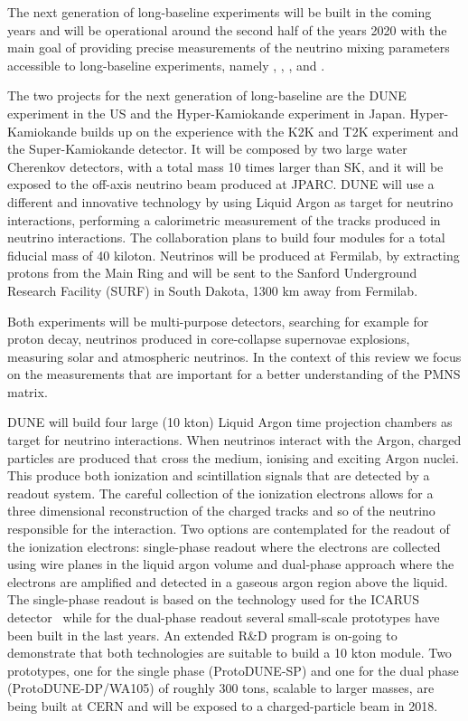The next generation of long-baseline experiments will be built in the coming years and will be operational around the second half of the years 2020 with the main goal of providing precise measurements of the neutrino mixing parameters accessible to long-baseline experiments, namely \thatm, \thint, \dmsq, and \dcp. 

The two projects for the next generation of long-baseline are the DUNE experiment in the US and the Hyper-Kamiokande experiment in Japan. Hyper-Kamiokande builds up on the experience with the K2K and T2K experiment and the Super-Kamiokande detector. It will be composed by two large water Cherenkov detectors, with a total mass 10 times larger than SK, and it will be exposed to the off-axis neutrino beam produced at JPARC. 
DUNE will use a different and innovative technology by using Liquid Argon as target for neutrino interactions, performing a calorimetric measurement of the tracks produced in neutrino interactions. The collaboration plans to build four modules for a total fiducial mass of 40 kiloton. Neutrinos will be produced at Fermilab, by extracting protons from the Main Ring and will be sent to the Sanford Underground Research Facility (SURF) in South Dakota, 1300 km away from Fermilab.

Both experiments will be multi-purpose detectors, searching for example for proton decay, neutrinos produced in core-collapse supernovae explosions, measuring solar and atmospheric neutrinos. In the context of this review we focus on the measurements  that are important for a better understanding of the PMNS matrix.

DUNE will build four large (10 kton) Liquid Argon time projection chambers as target for neutrino interactions. When neutrinos interact with the Argon, charged particles are produced that cross the medium, ionising and exciting Argon nuclei. This produce both ionization and scintillation signals that are detected by a readout system. The careful collection of the ionization electrons allows for a three dimensional reconstruction of the charged tracks and so of the neutrino responsible for the interaction. Two options are contemplated for the readout of the ionization electrons: single-phase readout where the electrons are collected using wire planes in the liquid argon volume and dual-phase approach where the electrons are amplified and detected in a gaseous argon region above the liquid. The single-phase readout is based on the technology used for the ICARUS detector~\cite{CANCI20121257} while for the dual-phase readout several small-scale prototypes have been built in the last years. An extended R\&D program is on-going to demonstrate that both technologies are suitable to build a 10 kton module. Two prototypes, one for the single phase (ProtoDUNE-SP) and one for the dual phase (ProtoDUNE-DP/WA105) of roughly 300 tons, scalable to larger masses, are being built at CERN and will be exposed to a charged-particle beam in 2018.  

